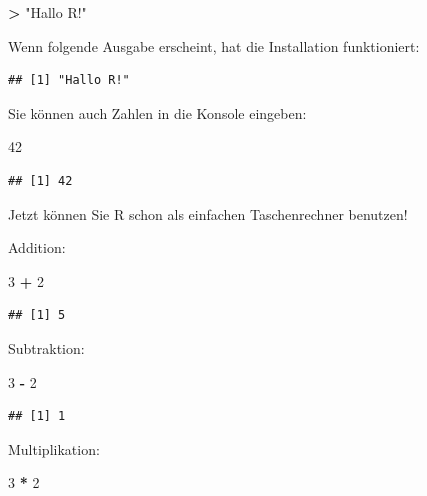 \documentclass[
  ngerman,
]{book}
\newenvironment{Shaded}{\begin{snugshade}}{\end{snugshade}}
\newcommand{\DecValTok}[1]{\textcolor[rgb]{0.00,0.00,0.81}{#1}}
\newcommand{\SpecialCharTok}[1]{\textcolor[rgb]{0.81,0.36,0.00}{\textbf{#1}}}
\newcommand{\StringTok}[1]{\textcolor[rgb]{0.31,0.60,0.02}{#1}}
\begin{document}
\begin{Shaded}
\begin{Highlighting}[]
\SpecialCharTok{\textgreater{}} \StringTok{"Hallo R!"}
\end{Highlighting}
\end{Shaded}

Wenn folgende Ausgabe erscheint, hat die Installation funktioniert:

\begin{verbatim}
## [1] "Hallo R!"
\end{verbatim}

Sie können auch Zahlen in die Konsole eingeben:

\begin{Shaded}
\begin{Highlighting}[]
\DecValTok{42}
\end{Highlighting}
\end{Shaded}

\begin{verbatim}
## [1] 42
\end{verbatim}

Jetzt können Sie R schon als einfachen Taschenrechner benutzen!

Addition:

\begin{Shaded}
\begin{Highlighting}[]
\DecValTok{3} \SpecialCharTok{+} \DecValTok{2}
\end{Highlighting}
\end{Shaded}

\begin{verbatim}
## [1] 5
\end{verbatim}

Subtraktion:

\begin{Shaded}
\begin{Highlighting}[]
\DecValTok{3} \SpecialCharTok{{-}} \DecValTok{2}
\end{Highlighting}
\end{Shaded}

\begin{verbatim}
## [1] 1
\end{verbatim}

Multiplikation:

\begin{Shaded}
\begin{Highlighting}[]
\DecValTok{3} \SpecialCharTok{*} \DecValTok{2}
\end{Highlighting}
\end{Shaded}
\end{document}
